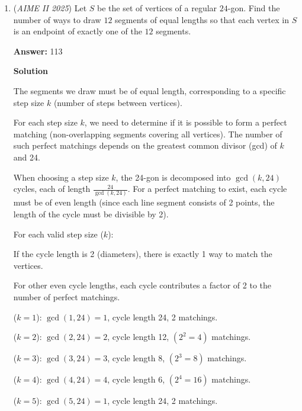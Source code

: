 \begin{enumerate}
 Thus, the total number of arrangements is $\binom{n}{8-n} \binom{9}{9-n}$. Summing this from $n=4$ to $n=8$ yields $\sum_{n=4}^{8} \binom{n}{8-n} \binom{9}{9-n} = 2907 \equiv \boxed{907} \pmod{1000}$.

 \href{https://mathproblemsolvingskills.wordpress.com/}{MathProblemSolvingSkills.com}

 


 


	\item (\textit{AIME II 2025}) Let $S$ be the set of vertices of a regular $24$-gon. Find the number of ways to draw $12$ segments of equal lengths so that each vertex in $S$ is an endpoint of exactly one of the $12$ segments.


 
 \textbf{Answer: }113



\textbf{Solution}

The segments we draw must be of equal length, corresponding to a specific step size $k$ (number of steps between vertices).

 For each step size $k$, we need to determine if it is possible to form a perfect matching (non-overlapping segments covering all vertices). The number of such perfect matchings depends on the greatest common divisor (gcd) of $k$ and 24.

 When choosing a step size $k$, the 24-gon is decomposed into $\gcd(k, 24)$ cycles, each of length $\frac{24}{\gcd(k, 24)}$. For a perfect matching to exist, each cycle must be of even length (since each line segment consists of 2 points, the length of the cycle must be divisible by 2).

 For each valid step size ($k$):

 If the cycle length is 2 (diameters), there is exactly 1 way to match the vertices.

 For other even cycle lengths, each cycle contributes a factor of 2 to the number of perfect matchings.

 ($k = 1$): $\gcd(1, 24) = 1$, cycle length 24, 2 matchings.

 ($k = 2$): $\gcd(2, 24) = 2$, cycle length 12, $(2^2 = 4)$ matchings.

 ($k = 3$): $\gcd(3, 24) = 3$, cycle length 8, $(2^3 = 8)$ matchings.

 ($k = 4$): $\gcd(4, 24) = 4$, cycle length 6, $(2^4 = 16)$ matchings.

 ($k = 5$): $\gcd(5, 24) = 1$, cycle length 24, 2 matchings.


\end{enumerate}
